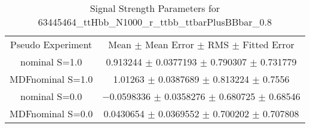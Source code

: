 \begin{table}
\centering
\caption{Signal Strength Parameters for 63445464\_ttHbb\_N1000\_r\_ttbb\_ttbarPlusBBbar\_0.8}
\begin{tabular}{cc}
\toprule
Pseudo Experiment & Mean $\pm$ Mean Error $\pm$ RMS $\pm$ Fitted Error\\
nominal S=1.0 & \num{0.913244} $\pm$ \num{0.0377193} $\pm$ \num{0.790307} $\pm$ \num{0.731779}\\
MDFnominal S=1.0 & \num{1.01263} $\pm$ \num{0.0387689} $\pm$ \num{0.813224} $\pm$ \num{0.7556}\\
nominal S=0.0 & \num{-0.0598336} $\pm$ \num{0.0358276} $\pm$ \num{0.680725} $\pm$ \num{0.68546}\\
MDFnominal S=0.0 & \num{0.0430654} $\pm$ \num{0.0369552} $\pm$ \num{0.700202} $\pm$ \num{0.707808}\\
\bottomrule
\end{tabular}
\end{table}